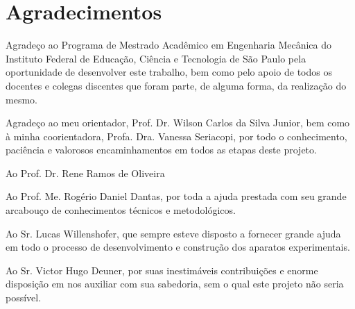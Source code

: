 \documentclass[
	12pt,				
	oneside,			
	a4paper,			
	english,			
	brazil,			
	]{abntex2ppgsi}
\begin{document}
\frenchspacing 



\imprimircapa

\imprimirfolhaderosto

\chapter*{Agradecimentos}

Agradeço ao Programa de Mestrado Acadêmico em Engenharia Mecânica do Instituto Federal de Educação, Ciência e Tecnologia de São Paulo pela oportunidade de desenvolver este trabalho, bem como pelo apoio de todos os docentes e colegas discentes que foram parte, de alguma forma, da realização do mesmo.

Agradeço ao meu orientador, Prof. Dr. Wilson Carlos da Silva Junior, bem como à minha coorientadora, Profa. Dra. Vanessa Seriacopi, por todo o conhecimento, paciência e valorosos encaminhamentos em todos as etapas deste projeto.

Ao Prof. Dr. Rene Ramos de Oliveira

Ao Prof. Me. Rogério Daniel Dantas, por toda a ajuda prestada com seu grande arcabouço de conhecimentos técnicos e metodológicos. 

Ao Sr. Lucas Willenshofer, que sempre esteve disposto a fornecer grande ajuda em todo o processo de desenvolvimento e construção dos aparatos experimentais.

Ao Sr. Victor Hugo Deuner, por suas inestimáveis contribuições e enorme disposição em nos auxiliar com sua sabedoria, sem o qual este projeto não seria possível. 


\newpage


\setlength{\absparsep}{18pt} %
\end{document}

